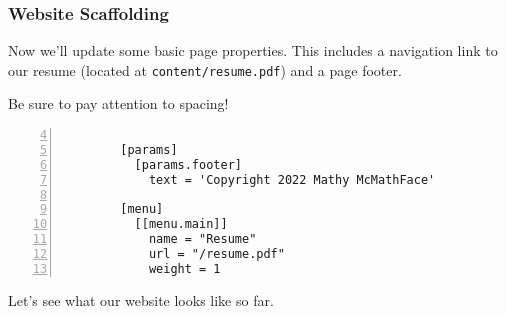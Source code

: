 \begin{frame}[fragile]
    \frametitle{Website Scaffolding}

    Now we'll update some basic page properties. This includes a navigation link to our resume (located at 
    \texttt{content/resume.pdf}) and a page footer.

    \bigskip
    
    Be sure to pay attention to spacing!

    \medskip

    \begin{lstlisting}[style=saneCode,gobble=8,title={config.toml [ctd.]},numbers=left,firstnumber=4]
        
        [params]
          [params.footer]
            text = 'Copyright 2022 Mathy McMathFace'
        
        [menu]
          [[menu.main]]
            name = "Resume"
            url = "/resume.pdf"
            weight = 1
    \end{lstlisting}

    \vfill

    Let's see what our website looks like so far.
\end{frame}